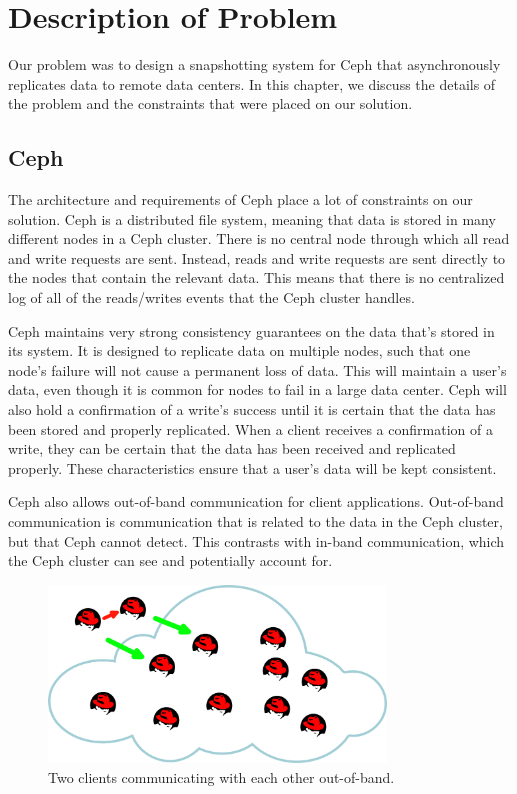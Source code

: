 \chapter{Description of Problem}
\label{sec:description}

Our problem was to design a snapshotting system for Ceph that asynchronously
replicates data to remote data centers. In this chapter, we discuss the details
of the problem and the constraints that were placed on our solution. 

\section{Ceph}

The architecture and requirements of Ceph place a lot of constraints on our
solution. Ceph is a distributed file system, meaning that data is stored in
many different nodes in a Ceph cluster. There
is no central node through which all read and write requests are sent. 
Instead, reads and write requests are sent directly to the nodes that contain
the relevant data. This means that there is no centralized log of all of the
reads/writes events that the Ceph cluster handles.

Ceph maintains very strong consistency guarantees on the data that's 
stored in its system. It is designed to replicate data on multiple nodes, such 
that one node's failure will not cause a permanent loss of data. This will 
maintain a user's data, even though it is common for nodes to fail in a large 
data center. Ceph will also hold a
confirmation of a write's success until it is certain that the data has been 
stored and properly replicated. When a client receives a confirmation of a write, they can be certain that the data has been received and replicated properly. These characteristics ensure that a user's 
data will be kept consistent.

Ceph also allows out-of-band communication for client applications. 
Out-of-band communication is communication that is related to the data in the 
Ceph cluster, but that Ceph cannot detect. This contrasts with in-band
communication, which the Ceph cluster can see and potentially account for. 

\begin{figure}[h]
  \centering
  \caption{Two clients communicating with each other out-of-band.} 
  \label{fig:out-of-band}
  \includegraphics[width=0.8\textwidth]{outofbandwrite.png}
\end{figure}

